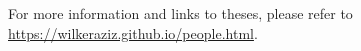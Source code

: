\begin{center}
\begin{tabular}{l p{} r }
    \bottomrule
\end{tabular}
\end{center}

For more information and links to theses, please refer to \url{https://wilkeraziz.github.io/people.html}.









